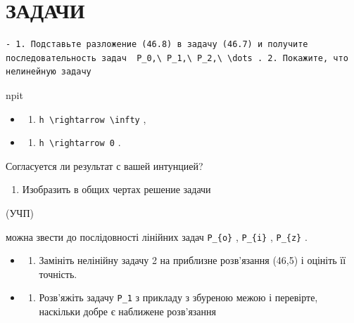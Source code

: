 \documentclass[
  ukrainian,
]{article}
\providecommand{\tightlist}{%
  \setlength{\itemsep}{0pt}\setlength{\parskip}{0pt}}
\begin{document}
\section{ЗАДАЧИ}\label{ux437ux430ux434ux430ux447ux438-2}

\begin{verbatim}
- 1. Подставьте разложение (46.8) в задачу (46.7) и получите последовательность задач  P_0,\ P_1,\ P_2,\ \dots . 2. Покажите, что нелинейную задачу
\end{verbatim}

npit

\begin{itemize}
\tightlist
\item
  \begin{enumerate}
  \def\labelenumi{\alph{enumi})}
  \tightlist
  \item
    \texttt{h\ \textbackslash{}rightarrow\ \textbackslash{}infty} ,
  \end{enumerate}
\item
  \begin{enumerate}
  \def\labelenumi{\arabic{enumi})}
  \setcounter{enumi}{5}
  \tightlist
  \item
    \texttt{h\ \textbackslash{}rightarrow\ 0} .
  \end{enumerate}
\end{itemize}

Согласуется ли результат с вашей интунцией?

\begin{enumerate}
\def\labelenumi{\arabic{enumi}.}
\setcounter{enumi}{3}
\tightlist
\item
  Изобразить в общих чертах решение задачи
\end{enumerate}

(УЧП)

можна звести до послідовності лінійних задач \texttt{P\_\{o\}} ,
\texttt{P\_\{i\}} , \texttt{P\_\{z\}} .

\begin{itemize}
\tightlist
\item
  \begin{enumerate}
  \def\labelenumi{\arabic{enumi}.}
  \setcounter{enumi}{2}
  \tightlist
  \item
    Замініть нелінійну задачу 2 на приблизне розв'язання (46,5) і
    оцініть її точність.
  \end{enumerate}
\item
  \begin{enumerate}
  \def\labelenumi{\arabic{enumi}.}
  \setcounter{enumi}{3}
  \tightlist
  \item
    Розв'яжіть задачу \texttt{P\_1} з прикладу з збуреною межою і
    перевірте, наскільки добре є наближене розв'язання
  \end{enumerate}
\end{itemize}
\end{document}

